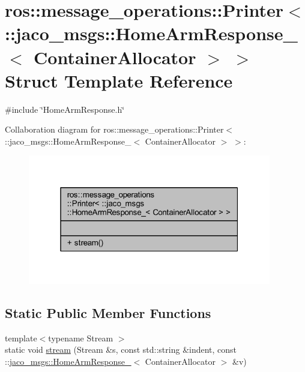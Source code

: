 \hypertarget{structros_1_1message__operations_1_1Printer_3_01_1_1jaco__msgs_1_1HomeArmResponse___3_01ContainerAllocator_01_4_01_4}{}\section{ros\+:\+:message\+\_\+operations\+:\+:Printer$<$ \+:\+:jaco\+\_\+msgs\+:\+:Home\+Arm\+Response\+\_\+$<$ Container\+Allocator $>$ $>$ Struct Template Reference}
\label{structros_1_1message__operations_1_1Printer_3_01_1_1jaco__msgs_1_1HomeArmResponse___3_01ContainerAllocator_01_4_01_4}


{\ttfamily \#include \char`\"{}Home\+Arm\+Response.\+h\char`\"{}}



Collaboration diagram for ros\+:\+:message\+\_\+operations\+:\+:Printer$<$ \+:\+:jaco\+\_\+msgs\+:\+:Home\+Arm\+Response\+\_\+$<$ Container\+Allocator $>$ $>$\+:
\nopagebreak
\begin{figure}[H]
\begin{center}
\leavevmode
\includegraphics[width=301pt]{db/df9/structros_1_1message__operations_1_1Printer_3_01_1_1jaco__msgs_1_1HomeArmResponse___3_01Containeca829233fcb18fc56b76effa8204c1d9}
\end{center}
\end{figure}
\subsection*{Static Public Member Functions}
\begin{DoxyCompactItemize}
\item 
{\footnotesize template$<$typename Stream $>$ }\\static void \hyperlink{structros_1_1message__operations_1_1Printer_3_01_1_1jaco__msgs_1_1HomeArmResponse___3_01ContainerAllocator_01_4_01_4_aacf5429780e888a2d85e534a5353adcf}{stream} (Stream \&s, const std\+::string \&indent, const \+::\hyperlink{structjaco__msgs_1_1HomeArmResponse__}{jaco\+\_\+msgs\+::\+Home\+Arm\+Response\+\_\+}$<$ Container\+Allocator $>$ \&v)
\end{DoxyCompactItemize}


